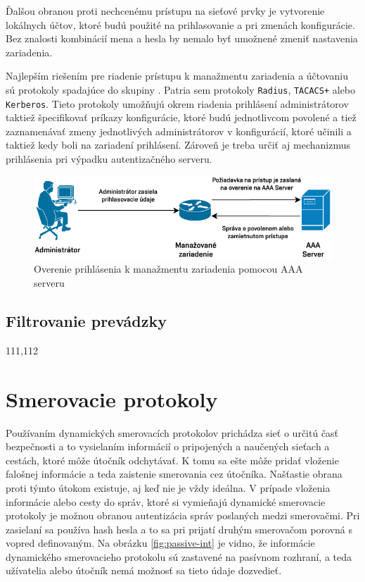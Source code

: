 \newpage
Ďalšou obranou proti nechcenému prístupu na sieťové prvky je vytvorenie lokálnych účtov, ktoré budú použité na prihlasovanie a pri zmenách konfigurácie. Bez znalosti kombinácií mena a hesla by nemalo byť umožnené zmeniť nastavenia zariadenia.  

Najlepším riešením pre riadenie prístupu k manažmentu zariadenia a účtovaniu sú protokoly spadajúce do skupiny . Patria sem protokoly \texttt{Radius}, \texttt{TACACS+} alebo \texttt{Kerberos}. Tieto protokoly umožňujú okrem riadenia prihlásení administrátorov taktiež špecifikovať príkazy konfigurácie, ktoré budú jednotlivcom povolené a tiež zaznamenávať zmeny jednotlivých administrátorov v konfigurácií, ktoré učinili a taktiež kedy boli na zariadení prihlásení. Zároveň je treba určiť aj mechanizmus prihlásenia pri výpadku autentizačného serveru.

\begin{figure}[H]
	\begin{center}
		\includegraphics[scale=1.1]{obrazky/AAA.pdf}
	\end{center}
	\caption[Overenie prihlásenia k manažmentu zariadenia pomocou AAA serveru]{Overenie prihlásenia k manažmentu zariadenia pomocou AAA serveru}
	\label{fig:aaa-mngmt}
\end{figure} 



\subsection*{Filtrovanie prevádzky}
111,112
\section*{Smerovacie protokoly}
Používaním dynamických smerovacích protokolov prichádza sieť o určitú časť bezpečnosti a to vysielaním informácií o pripojených a naučených sieťach a cestách, ktoré môže útočník odchytávať. K tomu sa ešte môže pridať vloženie falošnej informácie a teda zaistenie smerovania cez útočníka. Našťastie obrana proti týmto útokom existuje, aj keď nie je vždy ideálna. V prípade vloženia informácie alebo cesty do správ, ktoré si vymieňajú dynamické smerovacie protokoly je možnou obranou autentizácia správ poslaných medzi smerovačmi. Pri zasielaní sa používa hash hesla a to sa pri prijatí druhým smerovačom porovná s vopred definovaným. Na obrázku \ref{fig:passive-int} je vidno, že informácie dynamického smerovacieho protokolu sú zastavené na pasívnom rozhraní, a teda užívatelia alebo útočník nemá možnosť sa tieto údaje dozvedieť.

